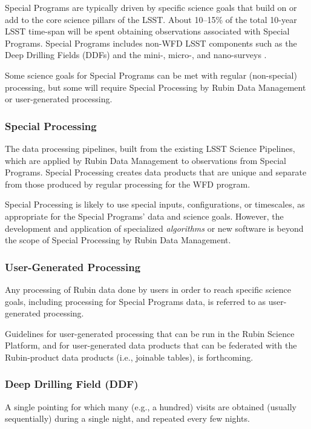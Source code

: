 Special Programs are typically driven by specific science goals that build on or 
add to the core science pillars of the LSST.
About 10--15\% of the total 10-year LSST time-span will be spent obtaining 
observations associated with Special Programs.
Special Programs includes non-WFD LSST components such as the Deep Drilling 
Fields (DDFs) and the mini-, micro-, and nano-surveys .

Some science goals for Special Programs can be met with regular (non-special) processing,
but some will require Special Processing by Rubin Data Management or user-generated processing.

\subsubsection{Special Processing}

The data processing pipelines, built from the existing LSST Science Pipelines, which are
applied by Rubin Data Management to observations from Special Programs.
Special Processing creates data products that are unique and separate from those produced
by regular processing for the WFD program.

Special Processing is likely to use special inputs, configurations, 
or timescales, as appropriate for the Special Programs' data and science goals.
However, the development and application of specialized \emph{algorithms} or new software
is beyond the scope of Special Processing by Rubin Data Management.

\subsubsection{User-Generated Processing}

Any processing of Rubin data done by users in order to reach specific science goals, including
processing for Special Programs data, is referred to as user-generated processing.

Guidelines for user-generated processing that can be run in the 
Rubin Science Platform, and for user-generated data products that can
be federated with the Rubin-product data products (i.e., joinable tables),
is forthcoming.

\subsubsection{Deep Drilling Field (DDF)}

A single pointing for which many (e.g., a hundred) visits are obtained 
(usually sequentially) during a single night, and repeated every few 
nights.

